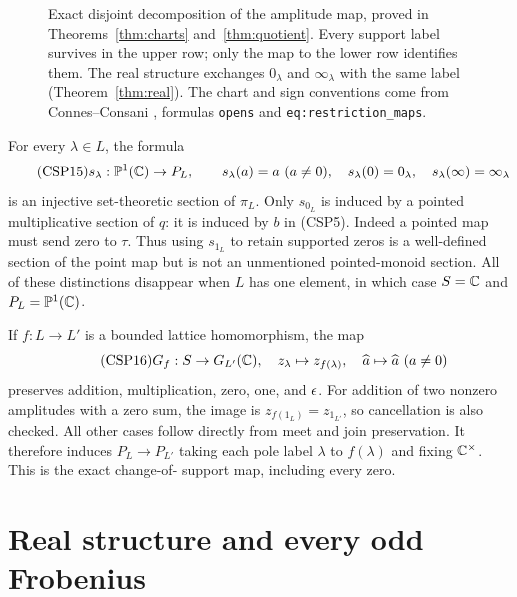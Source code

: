 \begin{figure}[ht]
\centering
{}
\caption{Exact disjoint decomposition of the amplitude map, proved in
Theorems~\ref{thm:charts} and~\ref{thm:quotient}.  Every support label
survives in the upper row; only the map to the lower row identifies
them.  The real structure exchanges $0_\lambda$ and $\infty_\lambda$
with the same label (Theorem~\ref{thm:real}).  The chart and sign
conventions come from Connes--Consani \cite{CSP-CC}, formulas
\texttt{opens} and \texttt{eq:restriction\_maps}.}
\end{figure}

For every $\lambda\in L$, the formula
\begin{equation}\tag{CSP15}
 s_\lambda:\mathbb P^1(\mathbb C)\to P_L,\qquad
 s_\lambda(a)=a\ (a\ne0),\quad
 s_\lambda(0)=0_\lambda,\quad
 s_\lambda(\infty)=\infty_\lambda
\end{equation}
is an injective set-theoretic section of $\pi_L$.  Only $s_{0_L}$ is
induced by a pointed multiplicative section of $q$: it is induced by
$b$ in (CSP5).  Indeed a pointed map must send zero to $\tau$.
Thus using $s_{1_L}$ to retain supported zeros is a well-defined
section of the point map but is not an unmentioned pointed-monoid
section.  All of these distinctions disappear when $L$ has one element,
in which case $S=\mathbb C$ and $P_L=\mathbb P^1(\mathbb C)$.

If $f:L\to L'$ is a bounded lattice homomorphism, the map
\begin{equation}\tag{CSP16}
 G_f:S\to G_{L'}(\mathbb C),\quad z_\lambda\mapsto z_{f(\lambda)},
 \quad\widehat a\mapsto\widehat a\ (a\ne0)
\end{equation}
preserves addition, multiplication, zero, one, and $\epsilon$.  For
addition of two nonzero amplitudes with a zero sum, the image is
$z_{f(1_L)}=z_{1_{L'}}$, so cancellation is also checked.  All other
cases follow directly from meet and join preservation.  It therefore
induces $P_L\to P_{L'}$ taking each pole label $\lambda$ to
$f(\lambda)$ and fixing $\mathbb C^\times$.  This is the exact change-of-
support map, including every zero.

\section{Real structure and every odd Frobenius}

